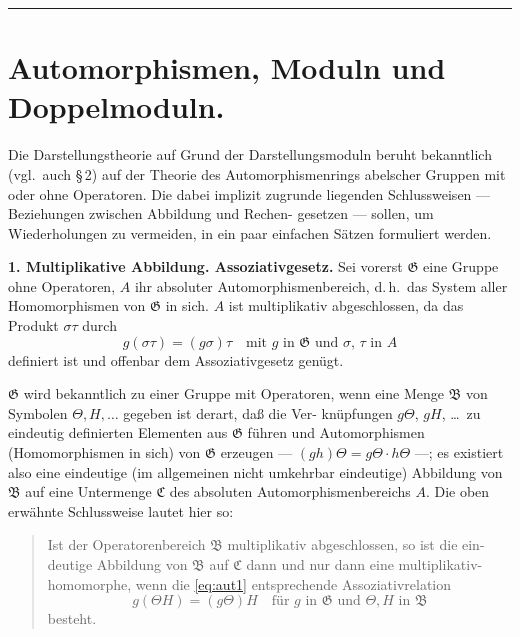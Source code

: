 \documentclass[12pt,a4paper]{article}
\theoremstyle{plain}
\newcommand{\Ga}{\mathfrak{G}}
\newcommand{\setB}{\mathfrak{B}}
\newcommand{\setC}{\mathfrak{C}}
\begin{document}
\vspace{0.5cm}
\noindent\rule{\textwidth}{0.6pt}
\vspace{0.5cm}

\section{Automorphismen, Moduln und Doppelmoduln.}
\label{sec:automorph}

Die Darstellungstheorie auf Grund der Darstellungsmoduln beruht
bekanntlich (vgl.\ auch \S\,2) auf der Theorie des Automorphismenrings
abelscher Gruppen mit oder ohne Operatoren. Die dabei implizit zugrunde
liegenden Schlussweisen --- Beziehungen zwischen Abbildung und Rechen-
gesetzen --- sollen, um Wiederholungen zu vermeiden, in ein paar einfachen
S\"atzen formuliert werden.

\medskip
\noindent\textbf{1. Multiplikative Abbildung. Assoziativgesetz.}\hspace{0.5em}%
Sei vorerst $\Ga$ eine Gruppe ohne Operatoren, $A$ ihr absoluter Automorphismenbereich,
d.\,h.\ das System aller Homomorphismen von $\Ga$ in sich. $A$ ist multiplikativ
abgeschlossen, da das Produkt $\sigma\tau$ durch
\begin{equation}\label{eq:aut1}
g(\sigma\tau) = (g\sigma)\tau \quad \text{mit $g$ in $\Ga$ und $\sigma$, $\tau$ in $A$}
\end{equation}
definiert ist und offenbar dem Assoziativgesetz gen\"ugt.

$\Ga$ wird bekanntlich zu einer Gruppe mit Operatoren, wenn eine
Menge $\setB$ von Symbolen $\Theta, H,\ldots$ gegeben ist derart, da\ss{} die Ver-
kn\"upfungen $g\Theta$, $gH$, \ldots\ zu eindeutig definierten Elementen aus $\Ga$ f\"uhren
und Automorphismen (Homomorphismen in sich) von $\Ga$ erzeugen ---
$(gh)\Theta = g\Theta \cdot h\Theta$ ---; es existiert also eine eindeutige (im allgemeinen
nicht umkehrbar eindeutige) Abbildung von $\setB$ auf eine Untermenge $\setC$ des
absoluten Automorphismenbereichs $A$. Die oben erw\"ahnte Schlussweise
lautet hier so:

\begin{quote}
Ist der Operatorenbereich $\setB$ multiplikativ abgeschlossen, so ist die ein-
deutige Abbildung von $\setB$ auf $\setC$ dann und nur dann eine multiplikativ-
homomorphe, wenn die \eqref{eq:aut1} entsprechende Assoziativrelation
\begin{equation}\label{eq:aut1a}
g(\Theta H) = (g\Theta)H \quad \text{f\"ur $g$ in $\Ga$ und $\Theta, H$ in $\setB$}
\end{equation}
besteht.
\end{quote}
\end{document}
